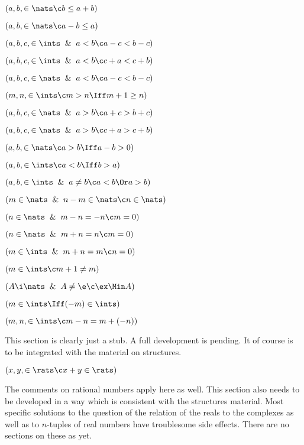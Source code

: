  $(a,b, \in \nats \c b \le a + b)$

 $(a,b,\in \nats \c a - b \le a )$

$(a,b,c, \in \ints \And a < b
\c a - c < b - c)$

 $(a,b,c, \in \ints \And a < b
\c  c + a < c +  b )$

$(a,b,c, \in \nats \And a < b
\c a - c < b - c)$

 $(m,n, \in \ints \c m > n \Iff
m + 1 \ge n)$

 $(a,b,c, \in \nats \And a > b
\c a + c > b + c)$

 $(a,b,c, \in \nats \And a > b
\c c + a  > c + b )$

 $(a,b,\in \nats \c a > b \Iff a - b > 0)$

 $(a,b, \in \ints \c a < b \Iff b > a)$

 $(a,b,\in \ints \And a \ne b\c a < b\Or a > b)$

 $(m \in \nats \And n - m \in \nats \c n \in \nats)$

 $(n \in \nats \And m - n = -n \c m = 0)$ 

 $(n \in \nats \And m + n = n \c m =  0)$

 $(m \in \ints \And m + n = m \c n = 0)$

 $(m \in \ints \c m + 1 \ne m)$

 $(A \i \nats \And A \ne \e \c \ex \Min A)$

 $(m \in \ints \Iff (-m) \in \ints)$

 $(m,n, \in \ints \c m - n = m + (-n))$

\lineb  


This section is clearly just a stub.  A full development  is pending.  It of course
is to be integrated with the material on structures.
\lineb


 $(x,y, \in \rats \c x + y \in \rats)$

\lineb  


The comments on rational numbers apply here as well.  This section 
also needs to be developed in a way which is consistent with the
structures material.  Most specific solutions
to the question of the relation of the reals to the complexes
as well as to $n$-tuples of real numbers have troublesome side effects.
There are no sections on these as yet.
\lineb


